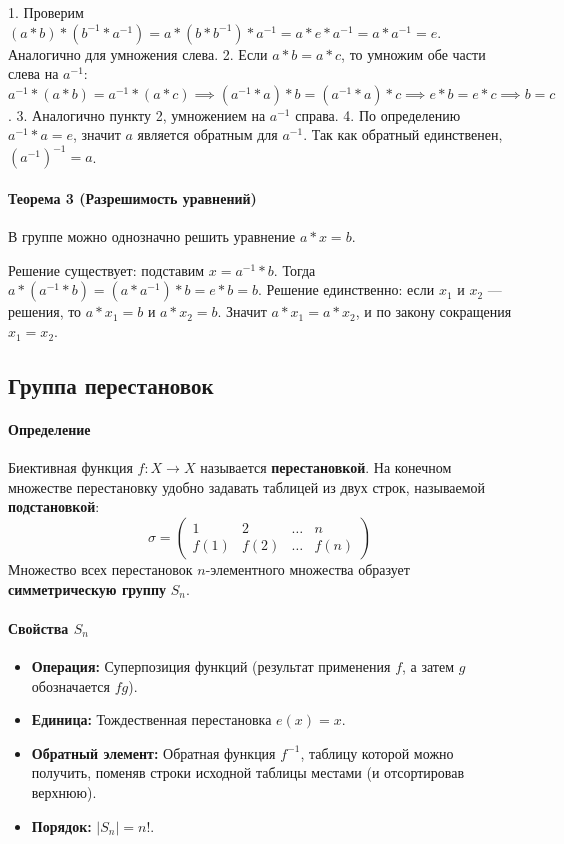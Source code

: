 1. Проверим $(a \ast b) \ast (b^{-1} \ast a^{-1}) = a \ast (b \ast b^{-1}) \ast a^{-1} = a \ast e \ast a^{-1} = a \ast a^{-1} = e$. Аналогично для умножения слева.
2. Если $a \ast b = a \ast c$, то умножим обе части слева на $a^{-1}$: $a^{-1} \ast (a \ast b) = a^{-1} \ast (a \ast c) \implies (a^{-1} \ast a) \ast b = (a^{-1} \ast a) \ast c \implies e \ast b = e \ast c \implies b = c$.
3. Аналогично пункту 2, умножением на $a^{-1}$ справа.
4. По определению $a^{-1} \ast a = e$, значит $a$ является обратным для $a^{-1}$. Так как обратный единственен, $(a^{-1})^{-1} = a$.

\paragraph{Теорема 3 (Разрешимость уравнений)}
В группе можно однозначно решить уравнение $a \ast x = b$.

Решение существует: подставим $x = a^{-1} \ast b$. Тогда $a \ast (a^{-1} \ast b) = (a \ast a^{-1}) \ast b = e \ast b = b$.
Решение единственно: если $x_1$ и $x_2$ — решения, то $a \ast x_1 = b$ и $a \ast x_2 = b$. Значит $a \ast x_1 = a \ast x_2$, и по закону сокращения $x_1 = x_2$.

\subsection*{Группа перестановок}

\paragraph{Определение}
Биективная функция $f: X \to X$ называется \textbf{перестановкой}. На конечном множестве перестановку удобно задавать таблицей из двух строк, называемой \textbf{подстановкой}:
$$\sigma = \begin{pmatrix} 1 & 2 & \dots & n \\ f(1) & f(2) & \dots & f(n) \end{pmatrix}$$
Множество всех перестановок $n$-элементного множества образует \textbf{симметрическую группу} $S_n$.

\paragraph{Свойства $S_n$}
\begin{itemize}
    \item \textbf{Операция:} Суперпозиция функций (результат применения $f$, а затем $g$ обозначается $fg$).
    \item \textbf{Единица:} Тождественная перестановка $e(x) = x$.
    \item \textbf{Обратный элемент:} Обратная функция $f^{-1}$, таблицу которой можно получить, поменяв строки исходной таблицы местами (и отсортировав верхнюю).
    \item \textbf{Порядок:} $|S_n| = n!$.
\end{itemize}

